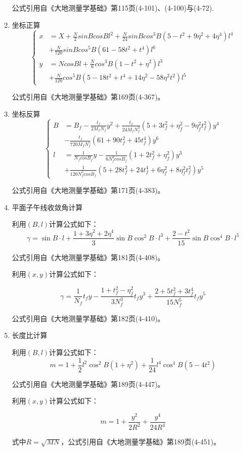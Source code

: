 \begin{enumerate}
公式引用自《大地测量学基础》第115页(4-101)、(4-100)与(4-72).


\item 坐标正算
\[
\left \{ \begin{aligned}
x&=X+\frac{N}{2}sinBcosBl^2 +\frac{N}{24}sinBcos^3B(5-t^2 +9\eta^2+4\eta^4)l^4 \\
  &+\frac{N}{720}sinBcos^5 B(61-58t^2 +t^4)l^6  \\
y&=NcosBl+\frac{N}{6}cos^3 B(1-t^2 +\eta^2 )l^3 \\
        &+\frac{N}{120}cos^5 B (5-18t^2+t^4 +14\eta^2 -58\eta^2t^2)l^5
\end{aligned} \right.
\]


公式引用自《大地测量学基础》第169页(4-367)。

\item 坐标反算
\[
\left \{ \begin{aligned}
B&=B_f - \frac{t_f}{2M_f N_f }y^2 +\frac{t_f}{24 M_f N_f ^3}
(5 + 3t_f ^2  + \eta_f ^2 - 9\eta_f ^2 t_f^2)y^4 \\
 &- \frac{t_f}{720 M_f N_f ^5}(61 + 90t_f ^2 + 45t_f ^4)y^6 \\
l&=\frac{1}{N_f cosB_f}y - \frac{1}{6N_f ^3 cosB_f}(1 + 2t_f ^2 + \eta_f ^2)y^3  \\
 &+ \frac{1}{120N_f ^5 cosB_f}(5 + 28t_f ^2 + 24t_f ^4 + 6\eta_f ^2 +8\eta_f ^2 t_f ^2)y^5
\end{aligned} \right.
\]

公式引用自《大地测量学基础》第171页(4-383)。


\item 平面子午线收敛角计算

利用$(B, l)$计算公式如下：
$$\gamma = \sin B \cdot l + \frac{1 + 3 \eta^2 + 2 \eta^4}{3} \sin B \cos ^2 B \cdot l^3
+ \frac{2 - t^2}{15}\sin B \cos ^4 B \cdot l^5$$

公式引用自《大地测量学基础》第181页(4-408)。

利用$(x, y)$计算公式如下：

$$\gamma = \frac{1}{N_f}t_f y - \frac{1+t_f ^2 - \eta_f ^2}{3N_f ^3}t_f y^3
+ \frac{2+5t_f^2+3t_f^4}{15N_f ^5}t_fy^5$$

公式引用自《大地测量学基础》第182页(4-410)。

\item 长度比计算

利用$(B, l)$计算公式如下：
$$m=1+\frac{1}{2}l^2 \cos ^2 B(1+\eta^2) + \frac{1}{24}l^4\cos ^4 B(5-4t^2)$$

公式引用自《大地测量学基础》第189页(4-447)。

利用$(x, y)$计算公式如下：

$$m=1+\frac{y^2}{2R^2} + \frac{y^4}{24R^4}$$

式中$R=\sqrt{MN}$，公式引用自《大地测量学基础》第189页(4-451)。

\end{enumerate}

